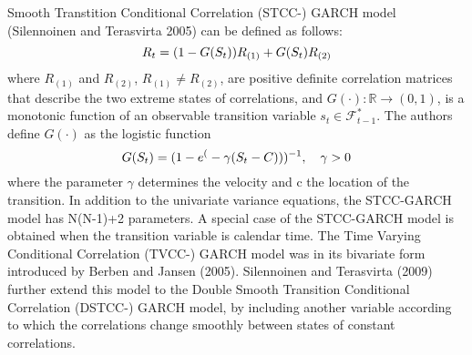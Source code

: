 \documentclass[a4paper,12pt]{article}
\begin{document}
\noindent Smooth Transtition Conditional Correlation (STCC-) GARCH model (Silennoinen and Terasvirta 2005) can be defined as follows:
\begin{equation}
\centering
R_t = (1 - G(S_t))R_{(1)} + G(S_t)R_{(2)}
\end{equation}
where $R_(1)$ and $R_(2)$, $R_{(1)}\neq R_(2)$, are positive definite correlation matrices that describe the two extreme states of correlations, and $G(\cdot):\mathbb{R} \rightarrow (0,1)$, is a monotonic function of an observable transition variable $s_t\in \mathcal{F}^{*}_{t-1}$. The authors define $G(\cdot)$ as the logistic function
\begin{equation}
\centering
G(S_t) = (1 - e^(-\gamma(S_t - C)))^{-1}, \ \ \ \gamma>0
\end{equation}
where the parameter $\gamma$ determines the velocity and c the location of the transition. In addition to the univariate variance equations, the STCC-GARCH model has N(N-1)+2 parameters. A special case of the STCC-GARCH model is obtained when the transition variable is calendar time. The Time Varying Conditional Correlation (TVCC-) GARCH model was in its bivariate form introduced by Berben and Jansen (2005). Silennoinen and Terasvirta (2009) further extend this model to the Double Smooth Transition Conditional Correlation (DSTCC-) GARCH model, by including another variable according to which the correlations change smoothly between states of constant correlations.\\
\end{document}

